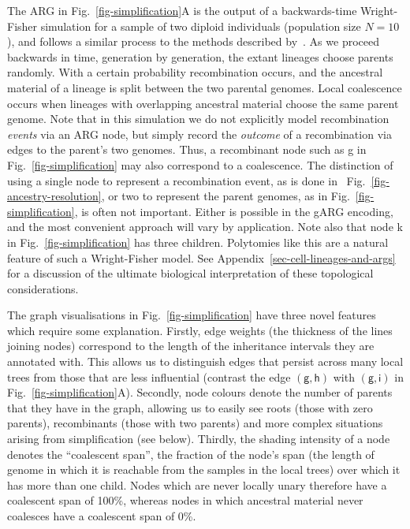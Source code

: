 \documentclass[9pt,twocolumn,twoside]{gsajnl}
\newcommand{\noderef}[1]{\textsf{#1}}
\begin{document}
The ARG in Fig.~\ref{fig-simplification}A is the output of a
backwards-time Wright-Fisher simulation for a sample of two diploid
individuals (population size $N=10$), and follows a similar process
to the methods described by~\cite{nelson2020accounting}.
As we proceed backwards in time, generation by generation, the
extant lineages choose parents randomly.
With a certain probability recombination occurs, and the ancestral
material of a lineage is split between the two parental
genomes. Local coalescence occurs
when lineages with overlapping ancestral material choose the same
parent genome.
Note that in this simulation we do not explicitly
model recombination \emph{events} via an ARG node, but simply record
the \emph{outcome} of a recombination via edges to
the parent's two genomes.
Thus, a recombinant node such as \noderef{g} in Fig.~\ref{fig-simplification}
may also correspond to a coalescence.
The distinction of
using a single node to represent
a recombination event, as is done in ~Fig.~\ref{fig-ancestry-resolution},
or two to represent the parent genomes, as in Fig.~\ref{fig-simplification},  
is often not important.
Either is possible in the gARG encoding, and 
the most convenient approach will vary by application.
Note also that node \noderef{k} in Fig.~\ref{fig-simplification} has three children.
Polytomies like this are a natural feature of such a Wright-Fisher model.
See Appendix~\ref{sec-cell-lineages-and-args} for a discussion of the 
ultimate biological interpretation of these topological considerations.

The graph visualisations in Fig.~\ref{fig-simplification} have
three novel features which require some explanation.
Firstly, edge weights (the thickness of the lines joining
nodes) correspond to the length of the inheritance intervals
they are annotated with. This allows us to distinguish
edges that persist across many local trees from those that are
less influential (contrast the edge
$(\noderef{g}, \noderef{h})$
with $(\noderef{g}, \noderef{i})$
in Fig.~\ref{fig-simplification}A).
Secondly, node colours denote the number of parents that they
have in the graph, allowing us to easily see roots (those
with zero parents), recombinants (those with two parents)
and more complex situations arising from simplification (see below).
Thirdly, the shading intensity of a node denotes the ``coalescent span'', the
fraction of the node's span (the length of genome in which it
is reachable from the samples in the local trees)
over which it has more than one child. Nodes which
are never locally unary therefore have a coalescent span of 100\%,
whereas nodes in which ancestral material never coalesces have a
coalescent span of 0\%.
\end{document}
